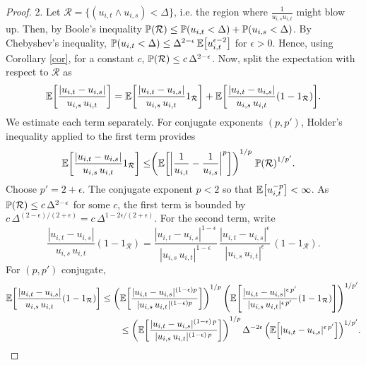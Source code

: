\documentclass[11pt, twoside]{report}
\begin{document}
\begin{proof}
2. Let $\mathcal R=\{ (u_{i,t}\wedge u_{i,s})<\Delta\}$, i.e. the region where $\frac{1}{u_{i,s}u_{i,t}}$ might blow up. Then, by Boole's inequality $\prob(\mathcal R) \le  \prob\pp{u_{i,t}<\Delta} +  \prob\pp{u_{i,s}<\Delta}$.  By Chebyshev's inequality, $\prob\pp{u_{i,t}<\Delta}\le  \Delta^{2-\epsilon}\, \mean{u_{i,t}^{\epsilon-2}}$ for $\epsilon>0$. Hence, using Corollary \ref{cor}, for a constant $c$, $\prob\pp{\mathcal R}\le c \,\Delta^{2-\epsilon}$. Now, split the expectation with respect to $\mathcal R$ as 
 \begin{equation}
     \mathbb{E} \bp{\frac {|u_{i,t}-u_{i,s}|}{u_{i,s}\,u_{i,t}}} 
     =   \mathbb{E} \bp{\frac {|u_{i,t}-u_{i,s}|}{u_{i,s}\,u_{i,t}}1_{\mathcal R}}
     +    \mathbb{E} \bp{\frac {|u_{i,t}-u_{i,s}|}{u_{i,s}\,u_{i,t}} (1-1_{\mathcal R})}.
 \end{equation}
 We estimate each term separately. For conjugate exponents $(p,p')$, Holder's inequality applied to the first term provides
 \begin{align*}
     \mathbb{E} \bp{\frac {|u_{i,t}-u_{i,s}|}{u_{i,s}\,u_{i,t}}1_{\mathcal R}}
  \le&     \pp{\mathbb{E} \bp{\abs{\frac 1 {u_{i,t}}-\frac1{u_{i,s}} }^p}
  }^{1/p}\;\prob\pp{\mathcal R}^{ 1/{p'}}. 
 \end{align*}
 Choose $p'=2+\epsilon$. The conjugate exponent $p<2$ so that  $\mean{u_{i,t}^{-p}}<\infty$. As $\mathbb{P}(\mathcal{R})\le c\, \Delta^{2-\epsilon}$ for some $c$, 
  the first term is bounded by $c\,\Delta^{
  (2-\epsilon)/(2+\epsilon)}= c\,\Delta^{1-2\epsilon/(2+\epsilon)}$. For the second term, write
  \[
     \frac {|u_{i,t}-u_{i,s}|}{u_{i,s}\,u_{i,t}} (1-1_{\mathcal R})
   =    \frac {|u_{i,t}-u_{i,s}|^{1-\epsilon}}{|u_{i,s}\,u_{i,t}|^{1-\epsilon}}\,\frac {|u_{i,t}-u_{i,s}|^{\epsilon}}{|u_{i,s}\,u_{i,t}|^{\epsilon}}\,
   (1-1_{\mathcal R}).
   \]
For $(p,p')$ conjugate,
 \begin{align*}
  \mathbb{E} \bp{\frac {|u_{i,t}-u_{i,s}|}{u_{i,s}\,u_{i,t}} (1-1_{\mathcal R})} & \le \pp{  \mathbb{E} \bp{\frac {|u_{i,t}-u_{i,s}|^{(1-\epsilon)p}}{|u_{i,s}\,u_{i,t}|^{(1-\epsilon)p}}}}^{1/p}\,\pp{ \mathbb{E} \bp{\frac {|u_{i,t}-u_{i,s}|^{\epsilon\,p'}}{|u_{i,s}\,u_{i,t}|^{\epsilon\,p'}}(1-1_{\mathcal R})}}^{1/p'}\\
&\qquad     \le  \pp{\mathbb{E} \bp{\frac {|u_{i,t}-u_{i,s}|^{(1-\epsilon)\,p}}{|u_{i,s}\,u_{i,t}|^{(1-\epsilon)\,p}}}}^{1/p}\, \Delta^{-2\epsilon
     }\,\pp{\mathbb{E} \bp{ {|u_{i,t}-u_{i,s}|^{\epsilon\, p'}}}}^{1/p'}.
   \end{align*}

\end{proof}
\end{document}
